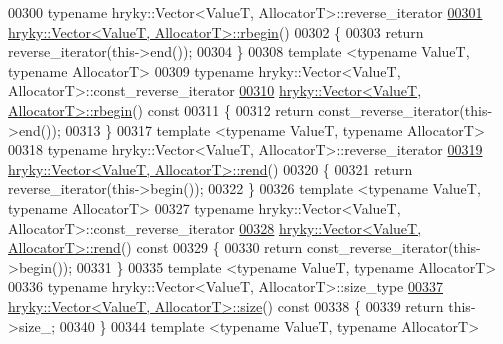 \begin{DoxyCode}
00300 \textcolor{keyword}{typename} hryky::Vector<ValueT, AllocatorT>::reverse\_iterator
\hypertarget{vector_8h_source_l00301}{}\hyperlink{classhryky_1_1_vector_a666d26f9ebb3d4979031d1e23ea96697}{00301} \hyperlink{classhryky_1_1_vector}{hryky::Vector<ValueT, AllocatorT>::rbegin}()
00302 \{
00303     \textcolor{keywordflow}{return} reverse\_iterator(this->end());
00304 \}
00308 \textcolor{keyword}{template} <\textcolor{keyword}{typename} ValueT, \textcolor{keyword}{typename} AllocatorT>
00309 \textcolor{keyword}{typename} hryky::Vector<ValueT, AllocatorT>::const\_reverse\_iterator
\hypertarget{vector_8h_source_l00310}{}\hyperlink{classhryky_1_1_vector_aa57c7fc8f218f0af46e526896a1ce4b1}{00310} \hyperlink{classhryky_1_1_vector}{hryky::Vector<ValueT, AllocatorT>::rbegin}()\textcolor{keyword}{ const}
00311 \textcolor{keyword}{}\{
00312     \textcolor{keywordflow}{return} const\_reverse\_iterator(this->end());
00313 \}
00317 \textcolor{keyword}{template} <\textcolor{keyword}{typename} ValueT, \textcolor{keyword}{typename} AllocatorT>
00318 \textcolor{keyword}{typename} hryky::Vector<ValueT, AllocatorT>::reverse\_iterator
\hypertarget{vector_8h_source_l00319}{}\hyperlink{classhryky_1_1_vector_adbdf08d14d8a77fba3573a8bc7b6bfd5}{00319} \hyperlink{classhryky_1_1_vector}{hryky::Vector<ValueT, AllocatorT>::rend}()
00320 \{
00321     \textcolor{keywordflow}{return} reverse\_iterator(this->begin());
00322 \}
00326 \textcolor{keyword}{template} <\textcolor{keyword}{typename} ValueT, \textcolor{keyword}{typename} AllocatorT>
00327 \textcolor{keyword}{typename} hryky::Vector<ValueT, AllocatorT>::const\_reverse\_iterator
\hypertarget{vector_8h_source_l00328}{}\hyperlink{classhryky_1_1_vector_a490a3a1b1aa1f3a31e02bd817f414398}{00328} \hyperlink{classhryky_1_1_vector}{hryky::Vector<ValueT, AllocatorT>::rend}()\textcolor{keyword}{ const}
00329 \textcolor{keyword}{}\{
00330     \textcolor{keywordflow}{return} const\_reverse\_iterator(this->begin());
00331 \}
00335 \textcolor{keyword}{template} <\textcolor{keyword}{typename} ValueT, \textcolor{keyword}{typename} AllocatorT>
00336 \textcolor{keyword}{typename} hryky::Vector<ValueT, AllocatorT>::size\_type
\hypertarget{vector_8h_source_l00337}{}\hyperlink{classhryky_1_1_vector_a4bf9016a68dd7bf4967bf202b884a4fa}{00337} \hyperlink{classhryky_1_1_vector}{hryky::Vector<ValueT, AllocatorT>::size}()\textcolor{keyword}{ const}
00338 \textcolor{keyword}{}\{
00339     \textcolor{keywordflow}{return} this->size\_;
00340 \}
00344 \textcolor{keyword}{template} <\textcolor{keyword}{typename} ValueT, \textcolor{keyword}{typename} AllocatorT>

\end{DoxyCode}
